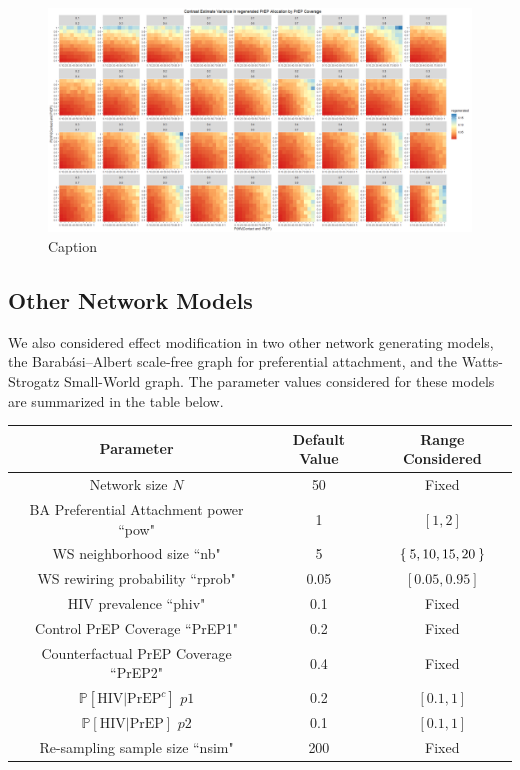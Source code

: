 \documentclass{article}
\theoremstyle{definition}
\begin{document}
\begin{figure}
    \centering
    \includegraphics[scale=0.35]{Figures/PrEP Regenerated Variance Plots.png}
    \caption{Caption}
    \label{fig:Figure 22}
\end{figure}

\subsection{Other Network Models}
We also considered effect modification in two other network generating models, the Barabási–Albert scale-free graph for preferential attachment, and the Watts-Strogatz Small-World graph. The parameter values considered for these models are summarized in the table below.
\begin{center}
    \begin{tabular}{|c|c|c|}
    \hline
         Parameter & Default Value & Range Considered  \\
         \hline
         Network size $N$& 50 & Fixed \\
         \hline
         BA Preferential Attachment power ``pow" & 1 & $\left[1,2 \right]$ \\
         \hline
         WS neighborhood size ``nb" & 5 & $\Set{5,10,15,20}$ \\
         \hline
         WS rewiring probability ``rprob" & 0.05 &$\left[0.05, 0.95 \right]$ \\
         \hline
         HIV prevalence ``phiv" & 0.1 & Fixed\\
         \hline
         Control PrEP Coverage ``PrEP1" & 0.2 & Fixed\\
         \hline
         Counterfactual PrEP Coverage ``PrEP2" & 0.4 & Fixed\\
         \hline
         $\mathbb{P}\left[\text{HIV} \vert \text{PrEP}^{c}\right]$ $p1$ & 0.2 & $[0.1,1]$\\
         \hline
         $\mathbb{P}\left[\text{HIV} \vert \text{PrEP}\right]$ $p2$ & 0.1 & $[0.1,1]$\\
         \hline
         Re-sampling sample size ``nsim" & 200 & Fixed\\
         \hline
    \end{tabular}
\end{center}
\end{document}
